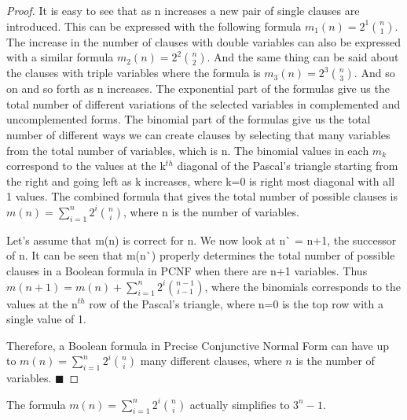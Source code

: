 \documentclass[runningheads,a4paper]{llncs}
\begin{document}
\begin{theorem}
\begin{proof}
It is easy to see that as n increases a new pair of single clauses are introduced. This can be expressed with the following formula $m_{1}(n) = 2^1 \binom{n} {1}$. The increase in the number of clauses with double variables can also be expressed with a similar formula $m_{2}(n) = 2^2 \binom{n} {2}$. And the same thing can be said about the clauses with triple variables where the formula is $m_{3}(n) = 2^3 \binom{n} {3}$. And so on and so forth as n increases. The exponential part of the formulas give us the total number of different variations of the selected variables in complemented and uncomplemented forms. The binomial part of the formulas give us the total number of different ways we can create clauses by selecting that many variables from the total number of variables, which is n. The binomial values in each $m_{k}$ correspond to the values at the k$^{th}$ diagonal of the Pascal's triangle starting from the right and going left as k increases, where k=0 is right most diagonal with all 1 values. The combined formula that gives the total number of possible clauses is $ m(n) = \sum_{i=1}^{n} 2^{i} \binom{n} {i}$, where n is the number of variables.

Let's assume that m(n) is correct for n. We now look at n\`{} = n+1, the successor of n. It can be seen that m(n\`{}) properly determines the total number of possible clauses in a Boolean formula in PCNF when there are n+1 variables. Thus $m(n+1) = m(n) + \sum_{i=1}^{n} 2^{i} \binom{n-1} {i-1}$, where the binomials corresponds to the values at the n$^{th}$ row of the Pascal's triangle, where n=0 is the top row with a single value of 1.

Therefore, a Boolean formula in Precise Conjunctive Normal Form can have up to $ m(n) = \sum_{i=1}^{n} 2^{i} \binom{n} {i}$  many different clauses, where $n$ is the number of variables. $\blacksquare$

\end{proof}
\end{theorem}

The formula $ m(n) = \sum_{i=1}^{n} 2^{i} \binom{n} {i}$ actually simplifies to $3^{n}-1$.
\newpage
\end{document}

